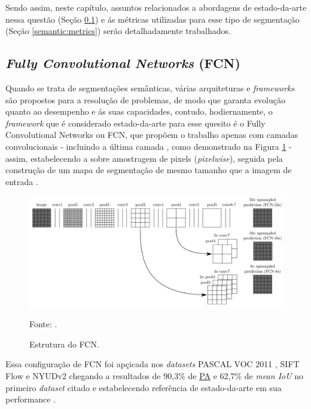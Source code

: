 Sendo assim, neste capítulo, assuntos relacionados a abordagens de estado-da-arte nessa questão (Seção \ref{semantic:FCN}) e ás métricas utilizadas para esse tipo de segmentação (Seção \ref{semantic:metrics}) serão detalhadamente trabalhados.


\subsection{\textit{Fully Convolutional Networks} (FCN)}
\label{semantic:FCN}

Quando se trata de segmentações semânticas, várias arquiteturas e \textit{frameworks} são propostos para a resolução de problemas, de modo que garanta evolução quanto ao desempenho e ás suas capacidades, contudo, hodiernamente, o \textit{framework} que é considerado estado-da-arte para esse quesito é o Fully Convolutional Networks \cite{Shelhamer2016} ou FCN, que propõem o trabalho apenas com camadas convolucionais - incluindo a última camada \cite{Hesamian2019}, como demonstrado na Figura \ref{semantic:fig:5} - assim, estabelecendo a sobre amostragem de pixels (\textit{pixelwise}), seguida pela construção de um mapa de segmentação de mesmo tamanho que a imagem de entrada \cite{Minaee2021, Zhang2018, Hesamian2019}.

\begin{figure}[H]
    \centering
    \caption{Estrutura do FCN.}
    \includegraphics[width=1\linewidth]{recursos/imagens/semantic/fcn_arch.png}
    \label{semantic:fig:5}

    \vspace*{1 cm}
    Fonte: \cite{Shelhamer2016}.
\end{figure}

Essa configuração de FCN foi apçicada nos \textit{datasets} PASCAL VOC 2011 \cite{everingham2010pascal}, SIFT Flow \cite{Liu2011SIFTApplications} e NYUDv2 \cite{Silberman:ECCV12} chegando a resultados de 90,3\% de \hyperref[semantic:pa]{PA} e 62,7\% de \textit{mean IoU} no primeiro \textit{dataset} citado \cite{Ghosh2019} e estabelecendo referência de estado-da-arte em sua performance \cite{Minaee2021}.

